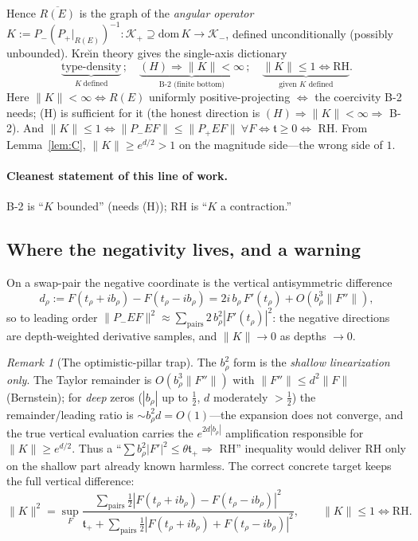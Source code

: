\documentclass[11pt]{amsart}
\theoremstyle{definition}
\theoremstyle{remark}
\newtheorem{remark}[theorem]{Remark}
\newcommand{\half}{\tfrac12}
\newcommand{\tform}{\mathfrak t}
\newcommand{\tplus}{\mathfrak t_+}
\newcommand{\Kop}{K}
\newcommand{\Norm}[1]{\lVert #1 \rVert}
\begin{document}
Hence $\overline{R(E)}$ is the graph of the \emph{angular operator}
$\Kop:=P_-(P_+|_{R(E)})^{-1}:\mathcal K_+\supseteq\mathrm{dom}\,\Kop\to\mathcal K_-$,
defined unconditionally (possibly unbounded). Kre\u{\i}n theory
\cite{AzizovIokhvidov,Bognar} gives the single-axis dictionary
\begin{equation}\label{eq:dict}
\boxed{\
\underbrace{\text{type-density}}_{\Kop\ \text{defined}}\,;\quad
\underbrace{(H)\Rightarrow\Norm{\Kop}<\infty}_{\text{B-2 (finite bottom)}}\,;\quad
\underbrace{\Norm{\Kop}\le1\iff\mathrm{RH}}_{\text{given }\Kop\text{ defined}}.\ }
\end{equation}
Here $\Norm{\Kop}<\infty\iff R(E)$ uniformly positive-projecting $\iff$ the coercivity
B-2 needs; (H) is sufficient for it (the honest direction is
$(H)\Rightarrow\Norm{\Kop}<\infty\Rightarrow$ B-2). And $\Norm{\Kop}\le1\iff
\Norm{P_-EF}\le\Norm{P_+EF}\ \forall F\iff\tform\ge0\iff$ RH. From Lemma~\ref{lem:C},
$\Norm{\Kop}\ge e^{d/2}>1$ on the magnitude side---the wrong side of $1$.

\paragraph{Cleanest statement of this line of work.} B-2 is ``$\Kop$ bounded'' (needs (H)); RH
is ``$\Kop$ a contraction.''

\subsection{Where the negativity lives, and a warning}
On a swap-pair the negative coordinate is the vertical antisymmetric difference
\[
d_\rho:=F(t_\rho+ib_\rho)-F(t_\rho-ib_\rho)=2i\,b_\rho\,F'(t_\rho)+O(b_\rho^{3}\Norm{F''}),
\]
so to leading order $\Norm{P_-EF}^{2}\approx\sum_{\text{pairs}}2\,b_\rho^{2}|F'(t_\rho)|^{2}$:
the negative directions are depth-weighted derivative samples, and $\Norm{\Kop}\to0$ as
depths $\to0$.

\begin{remark}[The optimistic-pillar trap]
The $b_\rho^{2}$ form is the \emph{shallow linearization only}. The Taylor remainder is
$O(b_\rho^{3}\Norm{F''})$ with $\Norm{F''}\le d^{2}\Norm{F}$ (Bernstein); for \emph{deep}
zeros ($|b_\rho|$ up to $\half$, $d$ moderately $>\half$) the remainder/leading ratio is
$\sim b_\rho^{2}d=O(1)$---the expansion does not converge, and the true vertical
evaluation carries the $e^{2d|b_\rho|}$ amplification responsible for
$\Norm{\Kop}\ge e^{d/2}$. Thus a ``$\sum b_\rho^{2}|F'|^{2}\le\theta\tplus\Rightarrow$ RH''
inequality would deliver RH only on the shallow part already known harmless. The correct
concrete target keeps the full vertical difference:
\begin{equation}\label{eq:rayleigh}
\Norm{\Kop}^{2}=\sup_F\frac{\sum_{\text{pairs}}\tfrac12|F(t_\rho+ib_\rho)-F(t_\rho-ib_\rho)|^{2}}
{\tplus+\sum_{\text{pairs}}\tfrac12|F(t_\rho+ib_\rho)+F(t_\rho-ib_\rho)|^{2}},
\qquad \Norm{\Kop}\le1\iff\mathrm{RH}.
\end{equation}
\end{remark}
\end{document}

